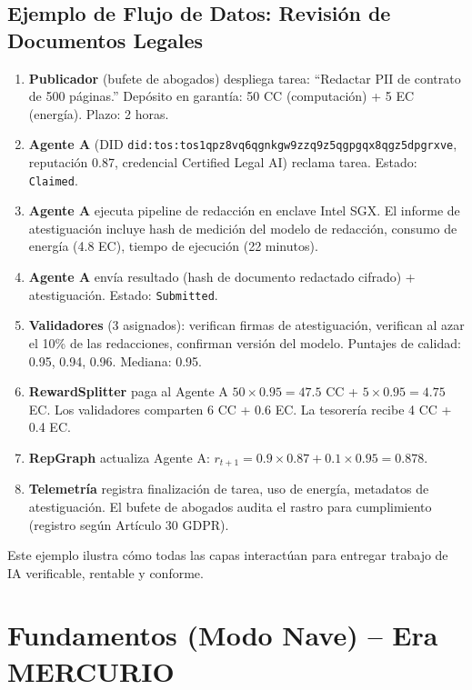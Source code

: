 \documentclass[11pt]{article}
\begin{document}
\subsection{Ejemplo de Flujo de Datos: Revisión de Documentos Legales}
\begin{enumerate}[label=\arabic*.]
  \item \textbf{Publicador} (bufete de abogados) despliega tarea: ``Redactar PII de contrato de 500 páginas.'' Depósito en garantía: 50 CC (computación) + 5 EC (energía). Plazo: 2 horas.
  \item \textbf{Agente A} (DID \texttt{did:tos:tos1qpz8vq6qgnkgw9zzq9z5qgpgqx8qgz5dpgrxve}, reputación 0.87, credencial Certified Legal AI) reclama tarea. Estado: \texttt{Claimed}.
  \item \textbf{Agente A} ejecuta pipeline de redacción en enclave Intel SGX. El informe de atestiguación incluye hash de medición del modelo de redacción, consumo de energía (4.8 EC), tiempo de ejecución (22 minutos).
  \item \textbf{Agente A} envía resultado (hash de documento redactado cifrado) + atestiguación. Estado: \texttt{Submitted}.
  \item \textbf{Validadores} (3 asignados): verifican firmas de atestiguación, verifican al azar el 10\% de las redacciones, confirman versión del modelo. Puntajes de calidad: 0.95, 0.94, 0.96. Mediana: 0.95.
  \item \textbf{RewardSplitter} paga al Agente A $50 \times 0.95 = 47.5$ CC + $5 \times 0.95 = 4.75$ EC. Los validadores comparten 6 CC + 0.6 EC. La tesorería recibe 4 CC + 0.4 EC.
  \item \textbf{RepGraph} actualiza Agente A: $r_{t+1} = 0.9 \times 0.87 + 0.1 \times 0.95 = 0.878$.
  \item \textbf{Telemetría} registra finalización de tarea, uso de energía, metadatos de atestiguación. El bufete de abogados audita el rastro para cumplimiento (registro según Artículo 30 GDPR).
\end{enumerate}

Este ejemplo ilustra cómo todas las capas interactúan para entregar trabajo de IA verificable, rentable y conforme.

\section{Fundamentos (Modo Nave) -- Era MERCURIO}
\end{document}
